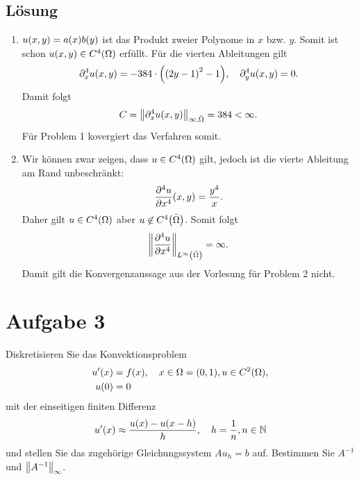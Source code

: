 \documentclass{exercise}
\begin{document}
    \subsection*{Lösung}
    \begin{enumerate}
        \item \(u\parentheses*{x, y} = a\parentheses*{x}b\parentheses*{y}\) ist das Produkt zweier Polynome in \(x\) bzw. \(y\).
        Somit ist schon \(u\parentheses*{x, y} \in C^4\parentheses*{\Omega}\) erfüllt.
        Für die vierten Ableitungen gilt
        \[
            \partial_x^4 u\parentheses*{x, y} = -384 \cdot \parentheses*{\parentheses*{2y - 1}^2 - 1}, \quad \partial_y^4 u\parentheses*{x, y} = 0.
        \]
        Damit folgt
        \[
            C = \norm*{\partial_x^4 u\parentheses*{x, y}}_{\infty, \bar{\Omega}} = 384 < \infty.
        \]
        Für Problem 1 kovergiert das Verfahren somit.
        \item Wir können zwar zeigen, dass \(u \in C^4\parentheses*{\Omega}\) gilt, jedoch ist die vierte Ableitung am Rand unbeschränkt:
        \[
            \frac{\partial^4 u}{\partial x^4}\parentheses*{x, y} = \frac{y^4}{x}.
        \]
        Daher gilt \(u \in C^4\parentheses*{\Omega}\) aber \(u \not\in C^4\parentheses*{\bar{\Omega}}\).
        Somit folgt
        \[
            \norm*{\frac{\partial^4 u}{\partial x^4}}_{L^\infty\parentheses*{\bar{\Omega}}} = \infty.
        \]
        Damit gilt die Konvergenzaussage aus der Vorlesung für Problem 2 nicht.
    \end{enumerate}


    \section*{Aufgabe 3}
    
    \begin{problem}
        Diskretisieren Sie das Konvektionsproblem
        \begin{align*}
            u'\parentheses*{x} &= f\parentheses*{x}, \quad x \in \Omega = \parentheses*{0, 1}, u \in C^2\parentheses*{\Omega},\\
            u\parentheses*{0} &= 0
        \end{align*}
        mit der einseitigen finiten Differenz
        \[
            u'\parentheses*{x} \approx \frac{u\parentheses*{x} - u\parentheses*{x - h}}{h}, \quad h = \frac{1}{n}, n \in \N
        \]
        und stellen Sie das zugehörige Gleichungssystem \(Au_h = b\) auf.
        Bestimmen Sie \(A^{-1}\) und \(\norm*{A^{-1}}_\infty\).
    \end{problem}
    
\end{document}
